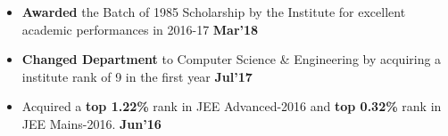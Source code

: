 \documentclass[10pt]{article}
\begin{document}
\begin{itemize}[leftmargin=*]
\item \textbf{Awarded} the Batch of 1985 Scholarship by the Institute for excellent academic performances in 2016-17 \href{https://github.com/shmundhra/Credentials/tree/master/Academics} {\hspace{0.5ex}\footnotesize\faMousePointer} {\hfill}\textbf{Mar'18}\\[-1.8em]
\item \textbf{Changed Department} to Computer Science \& Engineering by acquiring a institute rank of 9 in the first year \href{https://github.com/shmundhra/Credentials/tree/master/Academics} {\hspace{0.5ex}\footnotesize\faMousePointer} {\hfill}\textbf{Jul'17}\\[-1.8em]
\item Acquired a \textbf{top 1.22\%} rank in JEE Advanced-2016 and \textbf{top 0.32\%} rank in JEE Mains-2016. \href{https://github.com/shmundhra/Credentials/tree/master/Academics} {\hspace{0.5ex}\footnotesize\faMousePointer} {\hfill}\textbf{Jun'16}\\[-1.8em]
\end{itemize}
\end{document}
